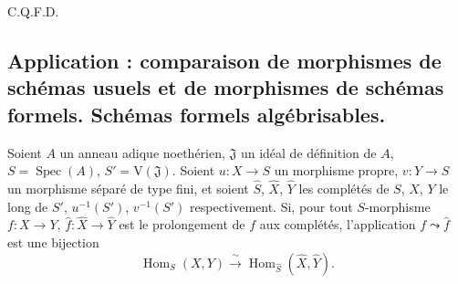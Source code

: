 \hfill C.Q.F.D.
\par

\subsection{Application : comparaison de morphismes de schémas usuels et de morphismes de schémas formels. Schémas formels algébrisables.}
\label{subsection:III.5.4-fr}

\begin{theorem}[5.4.1]
\label{III.5.4.1-fr}
Soient $A$ un anneau adique noethérien, $\mathfrak J$ un idéal de définition de
$A$, $S=\operatorname{Spec}(A)$, $S'=\mathrm V(\mathfrak J)$. Soient
$u:X\to S$ un morphisme propre, $v:Y\to S$ un morphisme séparé de type fini, et
soient $\widehat S$, $\widehat X$, $\widehat Y$ les complétés de $S$, $X$, $Y$ le
long de $S'$, $u^{-1}(S')$, $v^{-1}(S')$ respectivement. Si, pour tout
$S$-morphisme $f:X\to Y$, $\widehat f:\widehat X\to\widehat Y$ est le
prolongement de $f$ aux complétés, l'application $f\leadsto\widehat f$ est une
bijection
\[
\operatorname{Hom}_S(X,Y)\xrightarrow{\ \sim\ }
\operatorname{Hom}_{\widehat S}(\widehat X,\widehat Y).
\]
\end{theorem}

